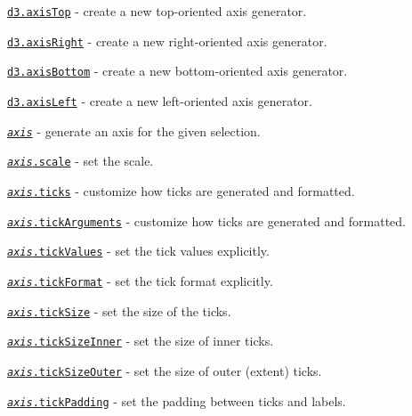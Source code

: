 \begin{DoxyItemize}
\item \href{https://github.com/d3/d3-axis/blob/master/README.md#axisTop}{\tt d3.\+axis\+Top} -\/ create a new top-\/oriented axis generator.
\item \href{https://github.com/d3/d3-axis/blob/master/README.md#axisRight}{\tt d3.\+axis\+Right} -\/ create a new right-\/oriented axis generator.
\item \href{https://github.com/d3/d3-axis/blob/master/README.md#axisBottom}{\tt d3.\+axis\+Bottom} -\/ create a new bottom-\/oriented axis generator.
\item \href{https://github.com/d3/d3-axis/blob/master/README.md#axisLeft}{\tt d3.\+axis\+Left} -\/ create a new left-\/oriented axis generator.
\item \href{https://github.com/d3/d3-axis/blob/master/README.md#_axis}{\tt {\itshape axis}} -\/ generate an axis for the given selection.
\item \href{https://github.com/d3/d3-axis/blob/master/README.md#axis_scale}{\tt {\itshape axis}.scale} -\/ set the scale.
\item \href{https://github.com/d3/d3-axis/blob/master/README.md#axis_ticks}{\tt {\itshape axis}.ticks} -\/ customize how ticks are generated and formatted.
\item \href{https://github.com/d3/d3-axis/blob/master/README.md#axis_tickArguments}{\tt {\itshape axis}.tick\+Arguments} -\/ customize how ticks are generated and formatted.
\item \href{https://github.com/d3/d3-axis/blob/master/README.md#axis_tickValues}{\tt {\itshape axis}.tick\+Values} -\/ set the tick values explicitly.
\item \href{https://github.com/d3/d3-axis/blob/master/README.md#axis_tickFormat}{\tt {\itshape axis}.tick\+Format} -\/ set the tick format explicitly.
\item \href{https://github.com/d3/d3-axis/blob/master/README.md#axis_tickSize}{\tt {\itshape axis}.tick\+Size} -\/ set the size of the ticks.
\item \href{https://github.com/d3/d3-axis/blob/master/README.md#axis_tickSizeInner}{\tt {\itshape axis}.tick\+Size\+Inner} -\/ set the size of inner ticks.
\item \href{https://github.com/d3/d3-axis/blob/master/README.md#axis_tickSizeOuter}{\tt {\itshape axis}.tick\+Size\+Outer} -\/ set the size of outer (extent) ticks.
\item \href{https://github.com/d3/d3-axis/blob/master/README.md#axis_tickPadding}{\tt {\itshape axis}.tick\+Padding} -\/ set the padding between ticks and labels.
\end{DoxyItemize}

